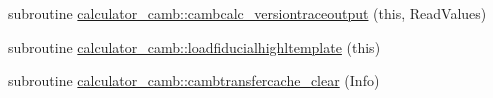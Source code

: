 \begin{DoxyCompactItemize}
\item 
subroutine \mbox{\hyperlink{namespacecalculator__camb_a67d98d7cdaa015cca41f95ed94678a79}{calculator\+\_\+camb\+::cambcalc\+\_\+versiontraceoutput}} (this, Read\+Values)
\item 
subroutine \mbox{\hyperlink{namespacecalculator__camb_a8eeaa2b45303d1bb5c7323cbf4767ce7}{calculator\+\_\+camb\+::loadfiducialhighltemplate}} (this)
\item 
subroutine \mbox{\hyperlink{namespacecalculator__camb_a74de7ed91f31c5cccb3f6c738f689295}{calculator\+\_\+camb\+::cambtransfercache\+\_\+clear}} (Info)
\end{DoxyCompactItemize}
